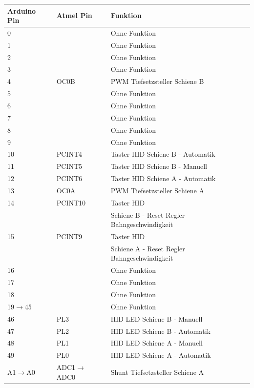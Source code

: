 \documentclass[a4paper, 11pt]{report}
\begin{document}
	\begin{table}[hb]
		\begin{tabular}{|l|l|l|}
			\hline
			\textbf{Arduino Pin} & \textbf{Atmel Pin} &\textbf{Funktion}\\
			\hline
			\hline
			0 &  & Ohne Funktion\\
			\hline
			1 &  & Ohne Funktion\\
			\hline
			2 &  & Ohne Funktion\\
			\hline
			3 &  & Ohne Funktion\\
			\hline
			4 & OC0B & PWM Tiefsetzsteller Schiene B\\
			\hline
			5 &  & Ohne Funktion\\
			\hline
			6 &  & Ohne Funktion\\
			\hline
			7 &  & Ohne Funktion\\
			\hline
			8 &  & Ohne Funktion\\
			\hline
			9 &  & Ohne Funktion\\
			\hline
			10 & PCINT4 & Taster HID \glqq Schiene B - Automatik\grqq \\
			\hline
			11 & PCINT5 & Taster HID \glqq Schiene B - Manuell\grqq \\
			\hline
			12 & PCINT6 & Taster HID \glqq Schiene A - Automatik\grqq \\
			\hline
			13 &  OC0A & PWM Tiefsetzsteller Schiene A\\
			\hline
			14	& PCINT10	& Taster HID \\
				&		& \glqq Schiene B - Reset Regler Bahngeschwindigkeit\grqq \\
			\hline
			15 	& PCINT9 	& Taster HID \\
				&		& \glqq Schiene A - Reset Regler Bahngeschwindigkeit\grqq \\
			\hline
			16 &  & Ohne Funktion\\
			\hline
			17 &  & Ohne Funktion\\
			\hline
			18 &  & Ohne Funktion\\
			\hline
			19$\rightarrow$45 &  & Ohne Funktion\\
			\hline
			46 & PL3 & HID LED \glqq Schiene B - Manuell\\
			\hline
			47 & PL2 & HID LED \glqq Schiene B - Automatik\\
			\hline
			48 & PL1 & HID LED \glqq Schiene A - Manuell\\
			\hline
			49 & PL0 & HID LED \glqq Schiene A - Automatik\\
			\hline
			A1$\rightarrow$A0 & ADC1$\rightarrow$ADC0 & Shunt Tiefsetzsteller Schiene A\\

\end{tabular}
\end{table}
\end{document}
